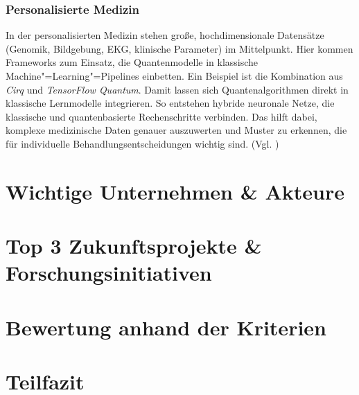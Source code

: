 \subsubsection*{Personalisierte Medizin}
In der personalisierten Medizin stehen große, hochdimensionale Datensätze (Genomik, Bildgebung, EKG, klinische Parameter) im Mittelpunkt. Hier kommen Frameworks zum Einsatz, die Quantenmodelle in klassische Machine"=Learning"=Pipelines einbetten. Ein Beispiel ist die Kombination aus \textit{Cirq} und \textit{TensorFlow Quantum}. Damit lassen sich Quantenalgorithmen direkt in klassische Lernmodelle integrieren. So entstehen hybride neuronale Netze, die klassische und quantenbasierte Rechenschritte verbinden. Das hilft dabei, komplexe medizinische Daten genauer auszuwerten und Muster zu erkennen, die für individuelle Behandlungsentscheidungen wichtig sind. (Vgl. \cite{tensorflowQuantum2020})

\section{Wichtige Unternehmen \& Akteure}


\section{Top 3 Zukunftsprojekte \& Forschungsinitiativen}


\section{Bewertung anhand der Kriterien}


\section{Teilfazit}


\printbibliography
